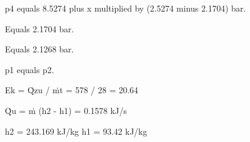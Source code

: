 p4 equals 8.5274 plus x multiplied by (2.5274 minus 2.1704) bar.

Equals 2.1704 bar.

Equals 2.1268 bar.

p1 equals p2.

Ek = Q̇zu / ṁt = 578 / 28 = 20.64  

Q̇u = ṁ (h2 - h1) = 0.1578 kJ/s  

h2 = 243.169 kJ/kg  
h1 = 93.42 kJ/kg